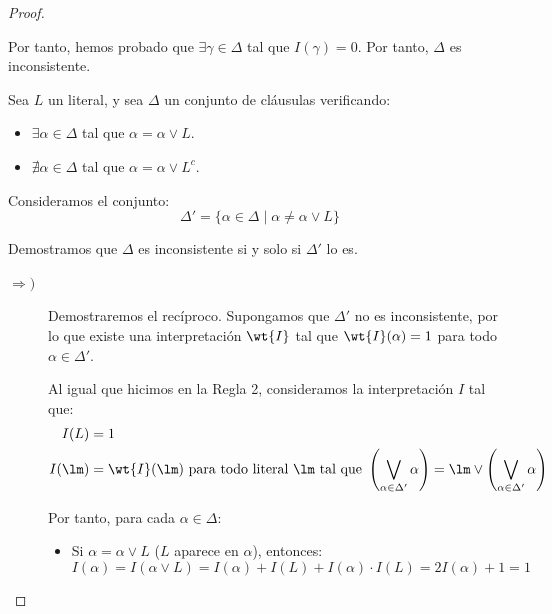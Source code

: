 \begin{teo}
\begin{proof}
\begin{description}
\begin{description}
                    Por tanto, hemos probado que $\exists \gamma\in \Delta$ tal que $I(\gamma)=0$. Por tanto, $\Delta$ es inconsistente.
                \end{description}

                \item[Regla 3.] Sea $L$ un literal, y sea $\Delta$ un conjunto de cláusulas verificando:
                \begin{itemize}
                    \item $\exists \alpha\in \Delta$ tal que $\alpha=\alpha\lor L$.
                    \item $\nexists \alpha\in \Delta$ tal que $\alpha=\alpha\lor L^c$.
                \end{itemize}

                Consideramos el conjunto:
                \begin{equation*}
                    \Delta'=\{\alpha\in \Delta\mid \alpha\neq \alpha\lor L\}
                \end{equation*}

                Demostramos que $\Delta$ es inconsistente si y solo si $\Delta'$ lo es.
                \begin{description}
                    \item[$\Longrightarrow)$] Demostraremos el recíproco. Supongamos que $\Delta'$ no es inconsistente, por lo que existe una interpretación $\wt{I}$ tal que $\wt{I}(\alpha)=1$ para todo $\alpha\in \Delta'$.
                    
                    Al igual que hicimos en la Regla 2, consideramos la interpretación $I$ tal que:
                    \begin{align*}
                        I(L)&=1\\
                        I(\lm)&=\wt{I}(\lm)\ \text{para todo literal}\ \lm\ \text{tal que} \ \left(\bigvee_{\alpha\in \Delta'} \alpha\right)=\lm\lor \left(\bigvee_{\alpha\in \Delta'} \alpha\right)
                    \end{align*}

                    Por tanto, para cada $\alpha\in \Delta$:
                    \begin{itemize}
                        \item Si $\alpha=\alpha\lor L$ ($L$ aparece en $\alpha$), entonces:
                        \begin{equation*}
                            I(\alpha)=I(\alpha\lor L)=I(\alpha)+I(L)+I(\alpha)\cdot I(L)=2I(\alpha)+1=1
                        \end{equation*}


\end{itemize}
\end{description}
\end{description}
\end{proof}
\end{teo}
